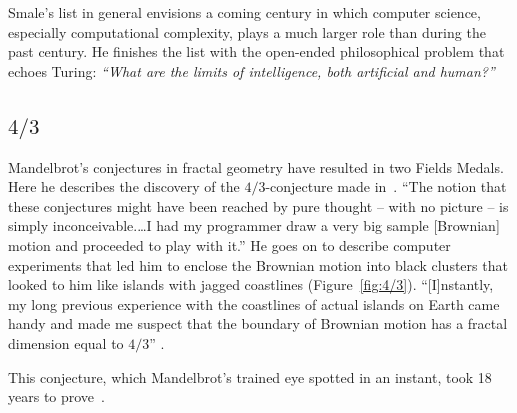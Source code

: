 \documentclass{llncs}
\begin{document}
Smale's list in general envisions a coming century in which computer
science, especially computational complexity, plays a much larger
role than during the past century. He finishes the list with the
open-ended philosophical problem  that echoes Turing: {\it
  ``What are the limits of intelligence, both artificial and human?''}


\subsection{$4/3$}
Mandelbrot's conjectures in fractal geometry have resulted in two
Fields Medals.  Here he describes the discovery of the
$4/3$-conjecture made in~\cite{ManFN}.  ``The notion that these
conjectures might have been reached by pure thought -- with no picture
-- is simply inconceivable.\dots I had my programmer draw a very big
sample [Brownian] motion and proceeded to play with it.''  He goes on
to describe computer experiments that led him to enclose the Brownian
motion into black clusters that looked to him like islands with jagged
coastlines (Figure~\ref{fig:4/3}).
``[I]nstantly, my long previous experience with the coastlines of
  actual islands on Earth came handy and made me suspect that the
  boundary of Brownian motion has a fractal dimension equal to $4/3$''
\cite{Man}.

This conjecture, which  Mandelbrot's trained eye spotted in an instant,
took 18 years to prove~\cite{LSW01}.
\end{document}
